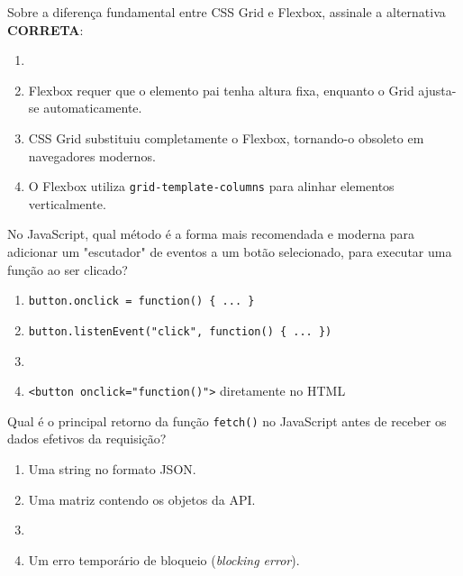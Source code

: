 \documentclass[12pt,a4paper]{article}
\newcommand{\correto}[1]{\iftoggle{gabarito}{\textbf{\color{corGabarito}#1}}{#1}}
\begin{document}
\begin{tcolorbox}[colback=white, colframe=azulTitulo, title=Questão 2: Layouts com CSS (Grid e Flexbox)]
    Sobre a diferença fundamental entre CSS Grid e Flexbox, assinale a alternativa \textbf{CORRETA}:
    \begin{enumerate}[label=\alph*)]
        \item \correto{O CSS Grid foi projetado para layouts bidimensionais (linhas e colunas), enquanto o Flexbox foi projetado primariamente para layouts unidimensionais (uma linha ou coluna por vez).}
        \item Flexbox requer que o elemento pai tenha altura fixa, enquanto o Grid ajusta-se automaticamente.
        \item CSS Grid substituiu completamente o Flexbox, tornando-o obsoleto em navegadores modernos.
        \item O Flexbox utiliza \texttt{grid-template-columns} para alinhar elementos verticalmente.
    \end{enumerate}
\end{tcolorbox}

\begin{tcolorbox}[colback=white, colframe=azulTitulo, title=Questão 3: Eventos no DOM]
    No JavaScript, qual método é a forma mais recomendada e moderna para adicionar um "escutador" de eventos a um botão selecionado, para executar uma função ao ser clicado?
    \begin{enumerate}[label=\alph*)]
        \item \texttt{button.onclick = function() \{ ... \}}
        \item \texttt{button.listenEvent("click", function() \{ ... \})}
        \item \correto{\texttt{button.addEventListener("click", function() \{ ... \})}}
        \item \texttt{<button onclick="function()">} diretamente no HTML
    \end{enumerate}
\end{tcolorbox}

\begin{tcolorbox}[colback=white, colframe=azulTitulo, title=Questão 4: Assincronicidade (Fetch)]
    Qual é o principal retorno da função \texttt{fetch()} no JavaScript antes de receber os dados efetivos da requisição?
    \begin{enumerate}[label=\alph*)]
        \item Uma string no formato JSON.
        \item Uma matriz contendo os objetos da API.
        \item \correto{Uma \textit{Promise} (promessa) que representará a resposta HTTP no futuro.}
        \item Um erro temporário de bloqueio (\textit{blocking error}).
    \end{enumerate}
\end{tcolorbox}
\end{document}

